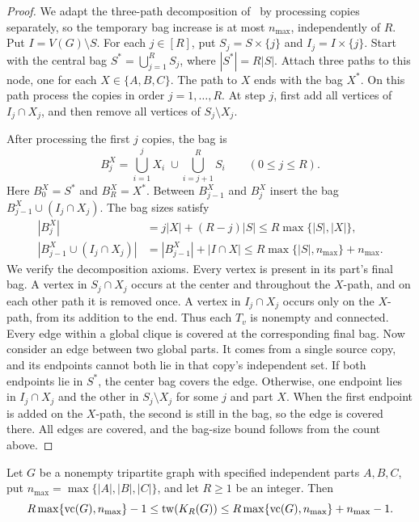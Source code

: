 \begin{proof}
We adapt the three-path decomposition of~\cite[Section~3.3]{BonnetTreewidth}
by processing copies separately, so the temporary bag increase is at
most $n_{\max}$, independently of $R$.
Put $I=V(G)\setminus S$.
For each $j\in[R]$, put $S_j=S\times\{j\}$ and $I_j=I\times\{j\}$.
Start with the central bag
$S^*=\bigcup_{j=1}^R S_j$, where $|S^*|=R|S|$. Attach three paths to this
node, one for each $X\in\{A,B,C\}$. The path to $X$ ends with the bag $X^*$.
On this path process the copies in order $j=1,\ldots,R$. At step $j$,
first add all vertices of $I_j\cap X_j$, and then remove all vertices
of $S_j\setminus X_j$.

After processing the first $j$ copies, the bag is
\[
 B^X_j=\bigcup_{i=1}^j X_i\;\cup\!\bigcup_{i=j+1}^R S_i
 \qquad(0\le j\le R).
\]
Here $B^X_0=S^*$ and $B^X_R=X^*$. Between $B^X_{j-1}$ and
$B^X_j$ insert the bag $B^X_{j-1}\cup(I_j\cap X_j)$.
The bag sizes satisfy
\[
\begin{aligned}
 |B^X_j|&=j|X|+(R-j)|S|\le R\max\{|S|,|X|\},\\
 |B^X_{j-1}\cup(I_j\cap X_j)|
 &=|B^X_{j-1}|+|I\cap X|
 \le R\max\{|S|,n_{\max}\}+n_{\max}.
\end{aligned}
\]
We verify the decomposition axioms. Every vertex is present in its
part's final bag. A vertex in $S_j\cap X_j$ occurs at the center and
throughout the $X$-path, and on each other path it is removed once.
A vertex in $I_j\cap X_j$ occurs only on the $X$-path, from its
addition to the end. Thus each $T_v$ is nonempty and connected.
Every edge within a global clique is covered at
the corresponding final bag. Now consider an edge between two global
parts. It comes from a single source copy, and its endpoints cannot
both lie in that copy's independent set. If both endpoints lie in
$S^*$, the center bag covers the edge. Otherwise, one endpoint lies
in $I_j\cap X_j$ and the other in $S_j\setminus X_j$ for some $j$
and part $X$. When the first endpoint is added on the $X$-path, the
second is still in the bag, so the edge is covered there. All edges
are covered, and the bag-size bound follows from the count above.
\end{proof}

\begin{lemma}\label{lem:tw-replication}
Let $G$ be a nonempty tripartite graph with specified independent
parts $A,B,C$, put $n_{\max}=\max\{|A|,|B|,|C|\}$, and let
$R\ge1$ be an integer. Then
\[
 R\max\{\operatorname{vc}(G),n_{\max}\}-1
 \leq\operatorname{tw}(K_R(G))\leq
 R\max\{\operatorname{vc}(G),n_{\max}\}+n_{\max}-1.
\]
\end{lemma}


